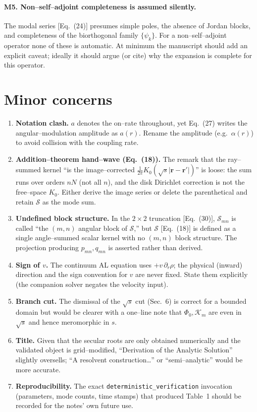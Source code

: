 \documentclass{article}
\begin{document}
\paragraph{M5. Non--self--adjoint completeness is assumed silently.}
The modal series [Eq.~(24)] presumes simple poles, the absence of Jordan blocks,
and completeness of the biorthogonal family $\{\psi_k\}$. For a non--self--adjoint
operator none of these is automatic. At minimum the manuscript should add an
explicit caveat; ideally it should argue (or cite) why the expansion is complete
for this operator.

\section{Minor concerns}
\begin{enumerate}[leftmargin=1.6em,label=m\arabic*.]
\item \textbf{Notation clash.} $a$ denotes the on--rate throughout, yet Eq.~(27)
writes the angular--modulation amplitude as $a(r)$. Rename the amplitude (e.g.\
$\alpha(r)$) to avoid collision with the coupling rate.
\item \textbf{Addition--theorem hand--wave (Eq.~(18)).} The remark that the
ray--summed kernel ``is the image--corrected $\tfrac{1}{2\pi}K_0(\sqrt s|\mathbf
r-\mathbf r'|)$'' is loose: the sum runs over orders $nN$ (not all $n$), and the
disk Dirichlet correction is not the free--space $K_0$. Either derive the image
series or delete the parenthetical and retain $\mathcal S$ as the mode sum.
\item \textbf{Undefined block structure.} In the $2\times2$ truncation [Eq.~(30)],
$\mathcal S_{mn}$ is called ``the $(m,n)$ angular block of $\mathcal S$,'' but
$\mathcal S$ [Eq.~(18)] is defined as a single angle--summed scalar kernel with no
$(m,n)$ block structure. The projection producing $p_{mn},q_{mn}$ is asserted
rather than derived.
\item \textbf{Sign of $v$.} The continuum AL equation uses $+v\,\partial_r\rho$;
the physical (inward) direction and the sign convention for $v$ are never fixed.
State them explicitly (the companion solver negates the velocity input).
\item \textbf{Branch cut.} The dismissal of the $\sqrt s$ cut (Sec.~6) is correct
for a bounded domain but would be clearer with a one--line note that
$\Phi_0,\mathcal K_m$ are even in $\sqrt s$ and hence meromorphic in $s$.
\item \textbf{Title.} Given that the secular roots are only obtained numerically
and the validated object is grid--modified, ``Derivation of the Analytic
Solution'' slightly oversells; ``A resolvent construction\dots'' or
``semi--analytic'' would be more accurate.
\item \textbf{Reproducibility.} The exact \texttt{deterministic\_verification}
invocation (parameters, mode counts, time stamps) that produced Table~1 should be
recorded for the notes' own future use.
\end{enumerate}
\end{document}
